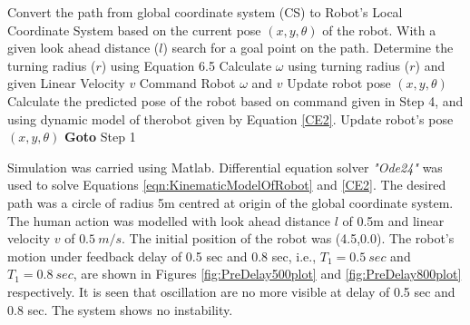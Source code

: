 \begin{algorithmic}[1]
	\State Convert the path from global coordinate system (CS) to Robot's Local Coordinate System based on the  current pose  $(x,y,\theta)$ of the robot.
	\State With a given look ahead distance ($l$) search for a goal point on the path.
	\State Determine the turning radius ($r$) using Equation 6.5 
	\State Calculate $\omega$ using turning radius ($r$) and given Linear Velocity $v$
	\State Command Robot $\omega$ and  $v$
		\State Update robot pose $(x,y,\theta)$
	\Else
		\State Calculate the predicted pose of the robot  based on command given in Step 4, and using dynamic model of therobot given by Equation \ref{CE2}.
		\State Update robot's pose $(x,y,\theta)$ 
	\EndIf
	\State\textbf{ Goto} Step 1
\end{algorithmic}	
 Simulation was carried using Matlab. Differential equation solver \textit{"Ode24"} was used to solve Equations \ref{eqn:KinematicModelOfRobot} and \ref{CE2}.  The desired path  was a circle of radius 5m centred at origin of the global coordinate system. The human action was modelled with look ahead distance $l$ of 0.5m and linear velocity $v$ of $0.5~m/s$. The initial position of the robot was (4.5,0.0). 
 The  robot's motion  under feedback delay of 0.5 sec and 0.8 sec, i.e.,  $T_1=0.5~sec$ and $T_1=0.8~sec$,  are shown in  Figures \ref{fig:PreDelay500plot} and \ref{fig:PreDelay800plot} respectively.   It is seen that oscillation are no more visible at delay of 0.5 sec  and   0.8 sec. The system shows no instability. 

